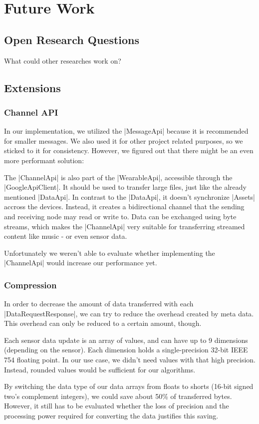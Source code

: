 \section{Future Work}
\label{sec:futurework}

\subsection{Open Research Questions}
What could other researches work on?

\subsection{Extensions}

\subsubsection{Channel API}
In our implementation, we utilized the |MessageApi|\cite{androiddocs:messageapi} because it is recommended for smaller messages.
We also used it for other project related purposes, so we sticked to it for consistency.
However, we figured out that there might be an even more performant solution:

The |ChannelApi|\cite{androiddocs:channelapi} is also part of the |WearableApi|\cite{androiddocs:wearable}, accessible through the |GoogleApiClient|\cite{androiddocs:googleapiclient}.
It should be used to transfer large files, just like the already mentioned |DataApi|\cite{androiddocs:dataapi}.
In contrast to the |DataApi|, it doesn't synchronize |Assets|\cite{androiddocs:asset} accross the devices.
Instead, it creates a bidirectional channel that the sending and receiving node may read or write to.
Data can be exchanged using byte streams, which makes the |ChannelApi| very suitable for transferring streamed content like music - or even sensor data.

Unfortunately we weren't able to evaluate whether implementing the |ChannelApi| would increase our performance yet.

\subsubsection{Compression}
In order to decrease the amount of data transferred with each |DataRequestResponse|\cite{sensordatalogger:datarequestresponse}, we can try to reduce the overhead created by meta data.
This overhead can only be reduced to a certain amount, though.

Each sensor data update is an array of values, and can have up to 9 dimensions (depending on the sensor).
Each dimension holds a single-precision 32-bit IEEE 754 floating point.
In our use case, we didn't need values with that high precision.
Instead, rounded values would be sufficient for our algorithms.

By switching the data type of our data arrays from floats to shorts (16-bit signed two's complement integers), we could save about 50\% of transferred bytes. However, it still has to be evaluated whether the loss of precision and the processing power required for converting the data justifies this saving.

\clearpage